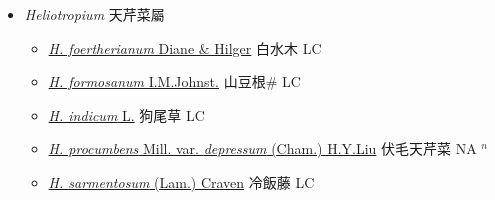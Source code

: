 
  \begin{itemize}
 \item[] \textit{Heliotropium} 天芹菜屬
                    
  \begin{itemize}
        \item[] \href{http://www.theplantlist.org/tpl1.1/search?q=Heliotropium+foertherianum}{\textit{H. foertherianum} Diane \& Hilger}     白水木 LC
        \item[] \href{http://www.theplantlist.org/tpl1.1/search?q=Heliotropium+formosanum}{\textit{H. formosanum} I.M.Johnst.}   山豆根\# LC
        \item[] \href{http://www.theplantlist.org/tpl1.1/search?q=Heliotropium+indicum}{\textit{H. indicum} L.}   狗尾草 LC
        \item[] \href{http://www.theplantlist.org/tpl1.1/search?q=Heliotropium+procumbens+var.+depressum}{\textit{H. procumbens} Mill. var. \textit{depressum} (Cham.) H.Y.Liu}   伏毛天芹菜 NA $^n$
        \item[] \href{http://www.theplantlist.org/tpl1.1/search?q=Heliotropium+sarmentosum}{\textit{H. sarmentosum} (Lam.) Craven}     冷飯藤 LC
  \end{itemize}
  \end{itemize}
